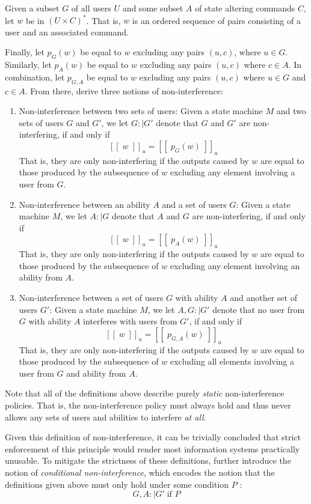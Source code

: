 Given a subset \(G\) of all users \(U\) and some subset \(A\) of state altering commands \(C\), let \(w\) be in \((U \times C)^*\). That is, \(w\) is an ordered sequence of pairs consisting of a user and an associated command. 

Finally, let \(p_G(w)\) be equal to \(w\) excluding any pairs \((u,c)\), where \(u \in G\). Similarly, let \(p_A(w)\) be equal to \(w\) excluding any pairs \((u,c)\) where \(c \in A\). In combination, let \(p_{G,A}\) be equal to \(w\) excluding any pairs \((u,c)\) where \(u \in G\) and \(c \in A\).
From there, \citeauthor{Goguen_Meseguer_82} derive three notions of non-interference:
\begin{enumerate}
    \item Non-interference between two sets of users: Given a state machine \(M\) and two sets of users \(G\) and \(G'\), we let \(G :\mid G'\) denote that \(G\) and \(G'\) are non-interfering, if and only if \[ 
        [[\;w\;]]_u = [[\;p_G(w)\;]]_u  
    \]
    That is, they are only non-interfering if the outputs caused by \(w\) are equal to those produced by the subsequence of \(w\) excluding any element involving a user from \(G\).
    \item Non-interference between an ability \(A\) and a set of users \(G\): Given a state machine \(M\), we let \(A :\mid G\) denote that \(A\) and \(G\) are non-interfering, if and only if \[
        [[\;w\;]]_u = [[\;p_A(w)\;]]_u  
    \]
    That is, they are only non-interfering if the outputs caused by \(w\) are equal to those produced by the subsequence of \(w\) excluding any element involving an ability from \(A\).
    \item Non-interference between a set of users \(G\) with ability \(A\) and another set of users \(G'\): Given a state machine \(M\), we let \(A,G :\mid G'\) denote that no user from \(G\) with ability \(A\) interferes with users from \(G'\), if and only if \[
        [[\;w\;]]_u = [[\;p_{G,A}(w)\;]]_u   
    \]
    That is, they are only non-interfering if the outputs caused by \(w\) are equal to those produced by the subsequence of \(w\) excluding all elements involving a user from \(G\) and ability from \(A\).
\end{enumerate}

Note that all of the definitions above describe purely \emph{static} non-interference policies. That is, the non-interference policy must always hold and thus never allows any sets of users and abilities to interfere \emph{at all}. 

Given this definition of non-interference, it can be trivially concluded that strict enforcement of this principle would render most information systems practically unusable.
To mitigate the strictness of these definitions, \citeauthor{Goguen_Meseguer_82} further introduce the notion of \emph{conditional non-interference}, which encodes the notion that the definitions given above must only hold under some condition \(P\) \cite{Goguen_Meseguer_82}: \[
     G,A :\mid G' \; \text{if } P 
\]

